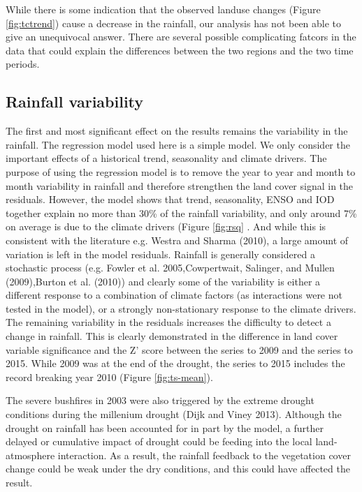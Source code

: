 \documentclass[]{elsarticle} %
\theoremstyle{definition}
\theoremstyle{definition}
\theoremstyle{definition}
\theoremstyle{remark}
\begin{document}
While there is some indication that the observed landuse changes (Figure
\ref{fig:tctrend}) cause a decrease in the rainfall, our analysis has
not been able to give an unequivocal answer. There are several possible
complicating fatcors in the data that could explain the differences
between the two regions and the two time periods.

\subsection{Rainfall variability}\label{rainfall-variability}

The first and most significant effect on the results remains the
variability in the rainfall. The regression model used here is a simple
model. We only consider the important effects of a historical trend,
seasonality and climate drivers. The purpose of using the regression
model is to remove the year to year and month to month variability in
rainfall and therefore strengthen the land cover signal in the
residuals. However, the model shows that trend, seasonality, ENSO and
IOD together explain no more than 30\% of the rainfall variability, and
only around 7\% on average is due to the climate drivers (Figure
\ref{fig:rsq} . And while this is consistent with the literature e.g.
Westra and Sharma (2010), a large amount of variation is left in the
model residuals. Rainfall is generally considered a stochastic process
(e.g. Fowler et al. 2005,Cowpertwait, Salinger, and Mullen (2009),Burton
et al. (2010)) and clearly some of the variability is either a different
response to a combination of climate factors (as interactions were not
tested in the model), or a strongly non-stationary response to the
climate drivers. The remaining variability in the residuals increases
the difficulty to detect a change in rainfall. This is clearly
demonstrated in the difference in land cover variable significance and
the Z' score between the series to 2009 and the series to 2015. While
2009 was at the end of the drought, the series to 2015 includes the
record breaking year 2010 (Figure \ref{fig:ts-mean}).

The severe bushfires in 2003 were also triggered by the extreme drought
conditions during the millenium drought (Dijk and Viney 2013). Although
the drought on rainfall has been accounted for in part by the model, a
further delayed or cumulative impact of drought could be feeding into
the local land-atmosphere interaction. As a result, the rainfall
feedback to the vegetation cover change could be weak under the dry
conditions, and this could have affected the result.
\end{document}
